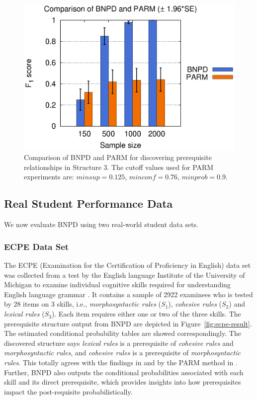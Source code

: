 \documentclass{edm_template}
\begin{document}
{		\begin{figure}[!th]
			\begin{center}
				\centering
					\includegraphics[width=0.7\linewidth]{figures/F1_parm.eps}
			\end{center}
			\caption{Comparison of BNPD and PARM for discovering prerequisite relationships in Structure 3. The cutoff values used for PARM experiments are: $ minsup=0.125$, $minconf=0.76$, $minprob=0.9$.}
			\label{fig:f1-parm} 
		\end{figure}	 
	
	\subsection{Real Student Performance Data}
	\label{sec:real}
	We now evaluate BNPD using two real-world student data sets.
	
	\subsubsection{ECPE Data Set}
	The ECPE (Examination for the Certification of Proficiency in English) data set was collected from a test by the English language Institute
	of the University of Michigan to examine individual cognitive skills required for understanding English language grammar \cite{templin2014hierarchical}.
	It contains a sample of 2922 examinees who is tested by 28 items on 3 skills, i.e., \emph{morphosyntactic rules} ($S_1$), \emph{cohesive rules} ($S_2$) 
	and \emph{lexical rules} ($S_3$). Each item requires either one or two of the three skills. 
	The prerequisite structure output from BNPD are depicted in Figure~\ref{fig:ecpe-result}. The estimated conditional probability tables are showed correspondingly.
	The discovered structure says \emph{lexical rules} is a prerequisite of \emph{cohesive rules} and \emph{morphosyntactic rules}, 
	and \emph{cohesive rules} is a prerequisite of \emph{morphosyntactic rules}. 
	This totally agrees with the findings in \cite{templin2014hierarchical} and by the PARM method in \cite{chen2015discovering}.
	Further, BNPD also outputs the conditional probabilities associated with each skill and its direct prerequisite, 
	which provides insights into how prerequisites impact the post-requisite probabilistically. 
	
}
\end{document}
